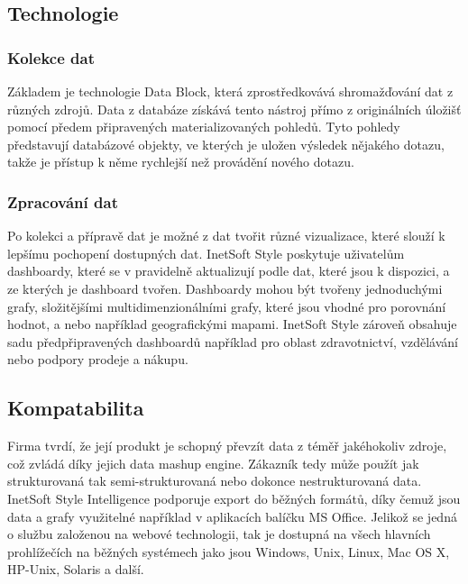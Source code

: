 \documentclass[czech,BP]{thesiskiv}
\begin{document}
\subsection{Technologie}
\subsubsection{Kolekce dat}
Základem je technologie Data Block\texttrademark, která zprostředkovává shromažďování dat z různých zdrojů. Data z databáze získává tento nástroj přímo z originálních úložišť pomocí předem připravených materializovaných pohledů. Tyto pohledy představují databázové objekty, ve kterých je uložen výsledek nějakého dotazu, takže je přístup k něme rychlejší než provádění nového dotazu.

\subsubsection{Zpracování dat}
Po kolekci a přípravě dat je možné z dat tvořit různé vizualizace, které slouží k lepšímu pochopení dostupných dat. InetSoft Style poskytuje uživatelům dashboardy, které se v pravidelně aktualizují podle dat, které jsou k dispozici, a ze kterých je dashboard tvořen. Dashboardy mohou být tvořeny jednoduchými grafy, složitějšími multidimenzionálními grafy, které jsou vhodné pro porovnání hodnot, a nebo například geografickými mapami. InetSoft Style zároveň obsahuje sadu předpřipravených dashboardů například pro oblast zdravotnictví, vzdělávání nebo podpory prodeje a nákupu. 


\subsection{Kompatabilita}
Firma tvrdí, že její produkt je schopný převzít data z téměř jakéhokoliv zdroje, což zvládá díky jejich data mashup engine. Zákazník tedy může použít jak strukturovaná tak semi-strukturovaná nebo dokonce nestrukturovaná data. InetSoft Style Intelligence podporuje export do běžných formátů, díky čemuž jsou data a grafy využitelné například v aplikacích balíčku MS Office. Jelikož se jedná o službu založenou na webové technologii, tak je dostupná na všech hlavních prohlížečích na běžných systémech jako jsou Windows, Unix, Linux, Mac OS X, HP-Unix, Solaris a další.\cite{InetKompatilbilita}
\end{document}
